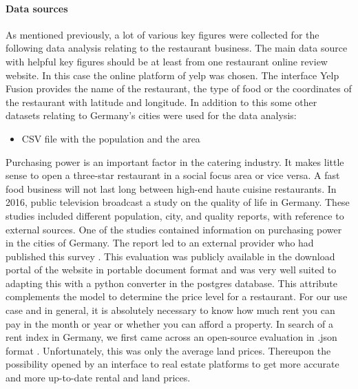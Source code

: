 \paragraph{Data sources}
\label{subsec:Data sources}
As mentioned previously, a lot of various key figures were collected for the following data analysis relating to the restaurant business. The main data source with helpful key figures should be at least from one restaurant online review website. In this case the online platform of yelp was chosen. The interface Yelp Fusion provides the name of the restaurant, the type of food or the coordinates of the restaurant with latitude and longitude.
\newline
In addition to this some other datasets relating to Germany's cities were used for the data analysis:
\begin{itemize}
\item CSV file with the population and the area
\end{itemize}

Purchasing power is an important factor in the catering industry. It makes little sense to open a three-star restaurant in a social focus area or vice versa. A fast food business will not last long between high-end haute cuisine restaurants. In 2016, public television broadcast a study on the quality of life in Germany. These studies included different population, city, and quality reports, with reference to external sources. One of the studies contained information on purchasing power in the cities of Germany. The report led to an external provider who had published this survey \cite{BuyingPower}. This evaluation was publicly available in the download portal of the website in portable document format and was very well suited to adapting this with a python converter in the postgres database. This attribute complements the model to determine the price level for a restaurant.
\newline
For our use case and in general, it is absolutely necessary to know how much rent you can pay in the month or year or whether you can afford a property. In search of a rent index in Germany, we first came across an open-source evaluation in .json format \cite{Sparda}. Unfortunately, this was only the average land prices. Thereupon the possibility opened by an interface to real estate platforms \cite{ImmoScout} to get more accurate and more up-to-date rental and land prices.
